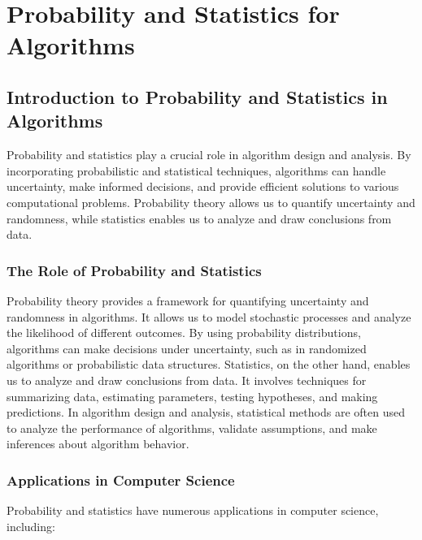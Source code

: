\documentclass[12pt]{book} %
\begin{document}
\chapter{Probability and Statistics for Algorithms}

\section{Introduction to Probability and Statistics in Algorithms}
Probability and statistics play a crucial role in algorithm design and analysis. By incorporating probabilistic and statistical techniques, algorithms can handle uncertainty, make informed decisions, and provide efficient solutions to various computational problems. Probability theory allows us to quantify uncertainty and randomness, while statistics enables us to analyze and draw conclusions from data.

\subsection{The Role of Probability and Statistics}
Probability theory provides a framework for quantifying uncertainty and randomness in algorithms. It allows us to model stochastic processes and analyze the likelihood of different outcomes. By using probability distributions, algorithms can make decisions under uncertainty, such as in randomized algorithms or probabilistic data structures. Statistics, on the other hand, enables us to analyze and draw conclusions from data. It involves techniques for summarizing data, estimating parameters, testing hypotheses, and making predictions. In algorithm design and analysis, statistical methods are often used to analyze the performance of algorithms, validate assumptions, and make inferences about algorithm behavior.

\subsection{Applications in Computer Science}
Probability and statistics have numerous applications in computer science, including:
\end{document}
